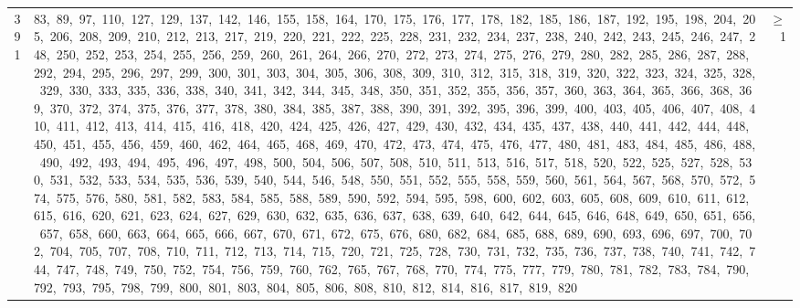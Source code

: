 \begin{longtable}{c|p{}|r}
391 & 83,\ 89,\ 97,\ 110,\ 127,\ 129,\ 137,\ 142,\ 146,\ 155,\ 158,\ 164,\ 170,\ 175,\ 176,\ 177,\ 178,\ 182,\ 185,\ 186,\ 187,\ 192,\ 195,\ 198,\ 204,\ 205,\ 206,\ 208,\ 209,\ 210,\ 212,\ 213,\ 217,\ 219,\ 220,\ 221,\ 222,\ 225,\ 228,\ 231,\ 232,\ 234,\ 237,\ 238,\ 240,\ 242,\ 243,\ 245,\ 246,\ 247,\ 248,\ 250,\ 252,\ 253,\ 254,\ 255,\ 256,\ 259,\ 260,\ 261,\ 264,\ 266,\ 270,\ 272,\ 273,\ 274,\ 275,\ 276,\ 279,\ 280,\ 282,\ 285,\ 286,\ 287,\ 288,\ 292,\ 294,\ 295,\ 296,\ 297,\ 299,\ 300,\ 301,\ 303,\ 304,\ 305,\ 306,\ 308,\ 309,\ 310,\ 312,\ 315,\ 318,\ 319,\ 320,\ 322,\ 323,\ 324,\ 325,\ 328,\ 329,\ 330,\ 333,\ 335,\ 336,\ 338,\ 340,\ 341,\ 342,\ 344,\ 345,\ 348,\ 350,\ 351,\ 352,\ 355,\ 356,\ 357,\ 360,\ 363,\ 364,\ 365,\ 366,\ 368,\ 369,\ 370,\ 372,\ 374,\ 375,\ 376,\ 377,\ 378,\ 380,\ 384,\ 385,\ 387,\ 388,\ 390,\ 391,\ 392,\ 395,\ 396,\ 399,\ 400,\ 403,\ 405,\ 406,\ 407,\ 408,\ 410,\ 411,\ 412,\ 413,\ 414,\ 415,\ 416,\ 418,\ 420,\ 424,\ 425,\ 426,\ 427,\ 429,\ 430,\ 432,\ 434,\ 435,\ 437,\ 438,\ 440,\ 441,\ 442,\ 444,\ 448,\ 450,\ 451,\ 455,\ 456,\ 459,\ 460,\ 462,\ 464,\ 465,\ 468,\ 469,\ 470,\ 472,\ 473,\ 474,\ 475,\ 476,\ 477,\ 480,\ 481,\ 483,\ 484,\ 485,\ 486,\ 488,\ 490,\ 492,\ 493,\ 494,\ 495,\ 496,\ 497,\ 498,\ 500,\ 504,\ 506,\ 507,\ 508,\ 510,\ 511,\ 513,\ 516,\ 517,\ 518,\ 520,\ 522,\ 525,\ 527,\ 528,\ 530,\ 531,\ 532,\ 533,\ 534,\ 535,\ 536,\ 539,\ 540,\ 544,\ 546,\ 548,\ 550,\ 551,\ 552,\ 555,\ 558,\ 559,\ 560,\ 561,\ 564,\ 567,\ 568,\ 570,\ 572,\ 574,\ 575,\ 576,\ 580,\ 581,\ 582,\ 583,\ 584,\ 585,\ 588,\ 589,\ 590,\ 592,\ 594,\ 595,\ 598,\ 600,\ 602,\ 603,\ 605,\ 608,\ 609,\ 610,\ 611,\ 612,\ 615,\ 616,\ 620,\ 621,\ 623,\ 624,\ 627,\ 629,\ 630,\ 632,\ 635,\ 636,\ 637,\ 638,\ 639,\ 640,\ 642,\ 644,\ 645,\ 646,\ 648,\ 649,\ 650,\ 651,\ 656,\ 657,\ 658,\ 660,\ 663,\ 664,\ 665,\ 666,\ 667,\ 670,\ 671,\ 672,\ 675,\ 676,\ 680,\ 682,\ 684,\ 685,\ 688,\ 689,\ 690,\ 693,\ 696,\ 697,\ 700,\ 702,\ 704,\ 705,\ 707,\ 708,\ 710,\ 711,\ 712,\ 713,\ 714,\ 715,\ 720,\ 721,\ 725,\ 728,\ 730,\ 731,\ 732,\ 735,\ 736,\ 737,\ 738,\ 740,\ 741,\ 742,\ 744,\ 747,\ 748,\ 749,\ 750,\ 752,\ 754,\ 756,\ 759,\ 760,\ 762,\ 765,\ 767,\ 768,\ 770,\ 774,\ 775,\ 777,\ 779,\ 780,\ 781,\ 782,\ 783,\ 784,\ 790,\ 792,\ 793,\ 795,\ 798,\ 799,\ 800,\ 801,\ 803,\ 804,\ 805,\ 806,\ 808,\ 810,\ 812,\ 814,\ 816,\ 817,\ 819,\ 820 & $\ge$ 1 \\

\end{longtable}

